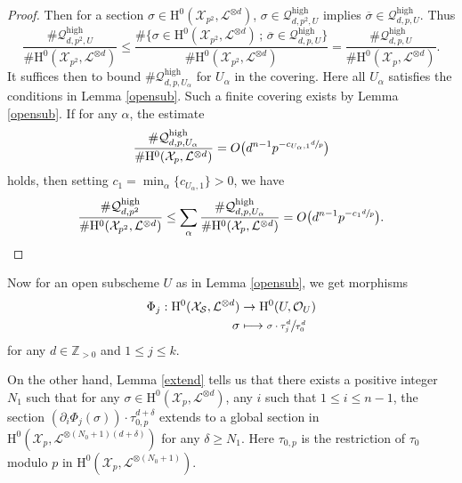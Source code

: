 \documentclass[11pt]{article}
\numberwithin{equation}{section}
\newcommand\mto{\mathchoice{\longmapsto}{\mapsto}{\mapsto}{\mapsto}}
\newcommand{\sep}{\,;\,}
\theoremstyle{plain}
\theoremstyle{definition}
\newcommand{\ho}{\mathrm{H}}
\newcommand{\X}{\mathcal{X}}
\newcommand{\li}{\mathcal{L}}
\newcommand{\Z}{\mathbb{Z}}
\begin{document}
\begin{proof}[Proof]
Then for a section $\sigma\in \ho^0(\X_{p^2}, \li^{\otimes d})$, $\sigma \in \mathcal{Q}^{\mathrm{high}}_{d,p^2,U}$ implies $\overline{\sigma}\in \mathcal{Q}^{\mathrm{high}}_{d,p,U}$. Thus
\[
\frac{\#\mathcal{Q}_{d,p^2,U}^{\mathrm{high}}}{\#\ho^0(\X_{p^2}, \li^{\otimes d})}\leq \frac{\#\{ \sigma\in \ho^0(\X_{p^2}, \li^{\otimes d})\sep \overline{\sigma}\in \mathcal{Q}^{\mathrm{high}}_{d,p,U} \} }{\#\ho^0(\X_{p^2}, \li^{\otimes d})} = \frac{\#\mathcal{Q}_{d,p,U}^{\mathrm{high}}}{\#\ho^0(\X_{p}, \li^{\otimes d})}.
\]
It suffices then to bound $\#\mathcal{Q}_{d,p,U_{\alpha}}^{\mathrm{high}}$ for $U_{\alpha}$ in the covering. Here all $U_{\alpha}$ satisfies the conditions in Lemma \ref{opensub}. Such a finite covering exists by Lemma \ref{opensub}. If for any $\alpha$, the estimate\vspace*{-3pt}
\[
\frac{\#\mathcal{Q}_{d,p,U_{\alpha}}^{\mathrm{high}}}{\#\ho^0(\X_{p}, \li^{\otimes d})}=O\bigl(d^{n-1}p^{-c_{U_{\alpha},1}\sfrac{d}{p}} \bigr)
\]
holds, then setting $c_1=\min_{\alpha}\{ c_{U_{\alpha},1} \}>0$, we have\vspace*{-3pt}
\[
\frac{\#\mathcal{Q}_{d,p^2}^{\mathrm{high}}}{\#\ho^0(\X_{p^2}, \li^{\otimes d})}\leq \sum_{\alpha}\frac{\#\mathcal{Q}_{d,p,U_{\alpha}}^{\mathrm{high}}}{\#\ho^0(\X_{p}, \li^{\otimes d})}=O\bigl(d^{n-1}p^{-c_1\sfrac{d}{p}} \bigr).\qedhere
\]
\end{proof}

Now for an open subscheme $U$ as in Lemma \ref{opensub}, we get morphisms
\begin{align*}
\Phi_j: \ho^0(\X_{\mathcal{S}}, \li^{\otimes d}) &\to \ho^0(U, \mathcal{O}_U) \\
\sigma &\mto \sfrac{\sigma\cdot \tau_j^d}{\tau_0^d}
\end{align*}
for any $d\in \Z_{>0}$ and $1\leq j\leq k$.

On the other hand, Lemma \ref{extend} tells us that there exists a positive integer $N_1$ such that for any $\sigma \in \ho^0(\X_{p}, \li^{\otimes d})$, any $i$ such that $1\leq i\leq n-1$, the section $\left(\partial_i \Phi_j(\sigma) \right)\cdot \tau_{0,p}^{d+\delta}$ extends to a global section in $\ho^0(\X_{p}, \li^{\otimes (N_0+1)(d+\delta)})$ for any $\delta \geq N_1$. Here $\tau_{0,p}$ is the restriction of $\tau_0$ modulo $p$ in $\ho^0(\X_p, \li^{\otimes (N_0+1)})$.
\end{document}
